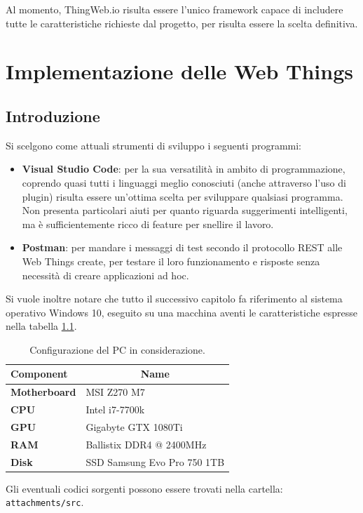 \documentclass[12pt,a4paper,openright,oneside]{report}
\begin{document}
Al momento, ThingWeb.io risulta essere l'unico framework capace di includere tutte le caratteristiche richieste dal progetto, per risulta essere la scelta definitiva.


\clearpage{\pagestyle{empty}\cleardoublepage}
\chapter{Implementazione delle Web Things}           %
\lhead[\fancyplain{}{\bfseries\thepage}]{\fancyplain{}{\bfseries\rightmark}}  

\section{Introduzione}

Si scelgono come attuali strumenti di sviluppo i seguenti programmi:

\begin{itemize}
	\item \textbf{Visual Studio Code}: per la sua versatilità in ambito di programmazione, coprendo quasi tutti i linguaggi meglio conosciuti (anche attraverso l'uso di plugin) risulta essere un'ottima scelta per sviluppare qualsiasi programma. Non presenta particolari aiuti per quanto riguarda suggerimenti intelligenti, ma è sufficientemente ricco di feature per snellire il lavoro.
	
	\item \textbf{Postman}: per mandare i messaggi di test secondo il protocollo REST alle Web Things create, per testare il loro funzionamento e risposte senza necessità di creare applicazioni ad hoc.
\end{itemize}

Si vuole inoltre notare che tutto il successivo capitolo fa riferimento al sistema operativo Windows 10, eseguito su una macchina aventi le caratteristiche espresse nella tabella \ref{tab:pc-spec}.\\

\begin{table}[h]
	\centering
	\begin{tabular}{|l|l|}
		\hline
		\textbf{Component}   & \multicolumn{1}{c|}{\textbf{Name}} \\ \hline
		\textbf{Motherboard} & MSI Z270 M7                        \\ \hline
		\textbf{CPU}         & Intel i7-7700k                     \\ \hline
		\textbf{GPU}         & Gigabyte GTX 1080Ti                \\ \hline
		\textbf{RAM}         & Ballistix DDR4 @ 2400MHz           \\ \hline
		\textbf{Disk}        & SSD Samsung Evo Pro 750 1TB                \\ \hline
	\end{tabular}
	\caption{\label{tab:pc-spec} Configurazione del PC in considerazione.}
\end{table}
Gli eventuali codici sorgenti possono essere trovati nella cartella:\\ \texttt{attachments/src}.
\end{document}
